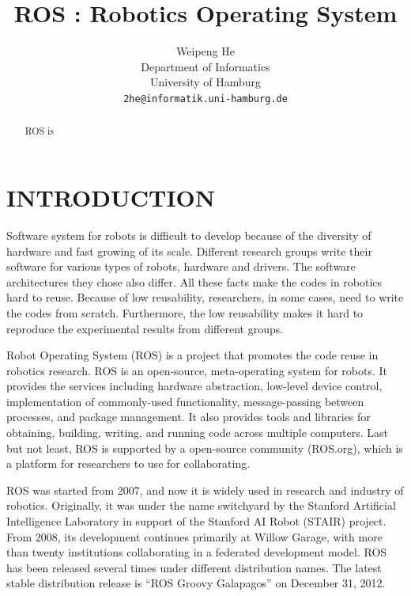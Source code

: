 \documentclass[a4paper, 10pt, conference]{ieeeconf}       %
\title{\LARGE \bf
  ROS : Robotics Operating System
}
\author{
  Weipeng He
\\ Department of Informatics\\ University of Hamburg \\ {\tt\small 2he@informatik.uni-hamburg.de}
}
\begin{document}
\maketitle
\thispagestyle{empty}
\pagestyle{empty}

\begin{abstract}
  ROS is
\end{abstract}


\section{INTRODUCTION}

Software system for robots is difficult to develop because of the diversity of hardware and fast growing of its scale. Different research groups write their software for various types of robots, hardware and drivers. The software architectures they chose also differ. All these facts make the codes in robotics hard to reuse. Because of low reusability, researchers, in some cases, need to write the codes from scratch. Furthermore, the low reusability makes it hard to reproduce the experimental results from different groups.

Robot Operating System (ROS) is a project that promotes the code reuse in robotics research\cite{quigley_ros:_2009}. ROS is an open-source, meta-operating system for robots. It provides the services including hardware abstraction, low-level device control, implementation of commonly-used functionality, message-passing between processes, and package management. It also provides tools and libraries for obtaining, building, writing, and running code across multiple computers. Last but not least, ROS is supported by a open-source community (ROS.org), which is a platform for researchers to use for collaborating.

ROS was started from 2007, and now it is widely used in research and industry of robotics. Originally, it was under the name switchyard by the Stanford Artificial Intelligence Laboratory in support of the Stanford AI Robot (STAIR) project. From 2008, its development continues primarily at Willow Garage, with more than twenty institutions collaborating in a federated development model. ROS has been released several times under different distribution names. The latest stable distribution release is ``ROS Groovy Galapagos'' on December 31, 2012\cite{_documentation_2013}.
\end{document}
